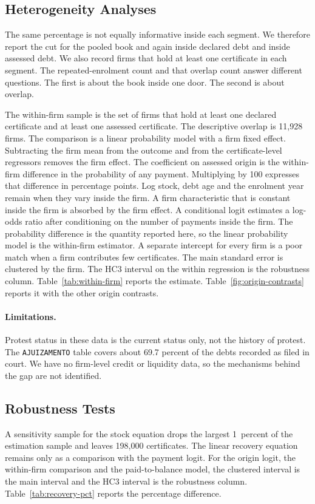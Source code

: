 \subsection{Heterogeneity Analyses}\label{sec:heterogeneity}

The same percentage is not equally informative inside each segment.
We therefore report the cut for the pooled book and again inside declared debt and inside assessed debt.
We also record firms that hold at least one certificate in each segment.
The repeated-enrolment count and that overlap count answer different questions.
The first is about the book inside one door.
The second is about overlap.

The within-firm sample is the set of firms that hold at least one declared certificate and at least one assessed certificate.
The descriptive overlap is 11,928 firms.
The comparison is a linear probability model with a firm fixed effect.
Subtracting the firm mean from the outcome and from the certificate-level regressors removes the firm effect.
The coefficient on assessed origin is the within-firm difference in the probability of any payment.
Multiplying by 100 expresses that difference in percentage points.
Log stock, debt age and the enrolment year remain when they vary inside the firm.
A firm characteristic that is constant inside the firm is absorbed by the firm effect.
A conditional logit estimates a log-odds ratio after conditioning on the number of payments inside the firm.
The probability difference is the quantity reported here, so the linear probability model is the within-firm estimator.
A separate intercept for every firm is a poor match when a firm contributes few certificates.
The main standard error is clustered by the firm.
The HC3 interval on the within regression is the robustness column.
Table~\ref{tab:within-firm} reports the estimate.
Table~\ref{fig:origin-contrasts} reports it with the other origin contrasts.

\paragraph{Limitations.}
Protest status in these data is the current status only, not the history of protest.
The \texttt{AJUIZAMENTO} table covers about 69.7 percent of the debts recorded as filed in court.
We have no firm-level credit or liquidity data, so the mechanisms behind the gap are not identified.

\subsection{Robustness Tests}\label{sec:robustness}

A sensitivity sample for the stock equation drops the largest 1~percent of the estimation sample and leaves 198,000 certificates.
The linear recovery equation remains only as a comparison with the payment logit.
For the origin logit, the within-firm comparison and the paid-to-balance model, the clustered interval is the main interval and the HC3 interval is the robustness column.
Table~\ref{tab:recovery-pct} reports the percentage difference.
